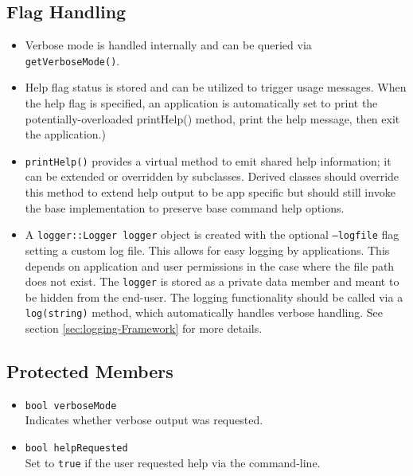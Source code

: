 \subsection*{Flag Handling}
\begin{itemize}
	\item Verbose mode is handled internally and can be queried via \texttt{getVerboseMode()}.
	\item Help flag status is stored and can be utilized to trigger usage messages. When the help flag is specified, an application is automatically set to print the potentially-overloaded printHelp() method, print the help message, then exit the application.)
	\item \texttt{printHelp()} provides a virtual method to emit shared help information; it can be extended or overridden by subclasses. Derived classes should override this method to extend help output to be app specific but should still invoke the base implementation to preserve base command help options.
	\item A \texttt{logger::Logger logger} object is created with the optional \texttt{--logfile} flag setting a custom log file. This allows for easy logging by applications. This depends on application and user permissions in the case where the file path does not exist. The \texttt{logger} is stored as a private data member and meant to be hidden from the end-user. The logging functionality should be called via a \texttt{log(string)} method, which automatically handles verbose handling. See section \ref{sec:logging-Framework} for more details.
\end{itemize}

\subsection*{Protected Members}
\begin{itemize}
	\item \texttt{bool verboseMode} \\
	Indicates whether verbose output was requested.
	\item \texttt{bool helpRequested} \\
	Set to \texttt{true} if the user requested help via the command-line.
\end{itemize}

